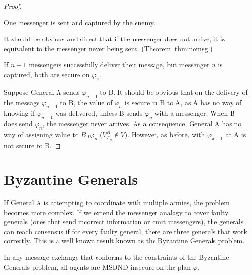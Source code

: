 \begin{proof}
\begin{case}
One messenger is sent and captured by the enemy.
\end{case}

It should be obvious and direct that if the messenger does not arrive, it is equivalent to the messenger never being sent. (Theorem \ref{thm:nomsg})

\begin{case}
If $n-1$ messengers successfully deliver their message, but messenger $n$ is captured, both are secure on $\varphi_{n}$.
\end{case}

Suppose General A sends $\varphi_{n-1}$ to B. It should be obvious that on the delivery of the message $\varphi_{n-1}$ to B, the value of $\varphi_{n}$ is secure in B to A, as A has no way of knowing if $\varphi_{n-1}$ was delivered, unless B sends $\varphi_{n}$ with a messenger. When B does send $\varphi_{n}$, the messenger never arrives. As a consequence, General A has no way of assigning value to $B_A \varphi_n$ ($V_{\varphi_n}^A \not \in V$). However, as before, with $\varphi_{n-1}$ at A is not secure to B.
\end{proof}


\section{Byzantine Generals}

If General A is attempting to coordinate with multiple armies, the problem becomes more complex. If we extend the messenger analogy to cover faulty generals (ones that send incorrect information or omit messengers), the generals can reach consensus if for every faulty general, there are three generals that work correctly. This is a well known result known as the Byzantine Generals problem.

\begin{thm}
In any message exchange that conforms to the constraints of the Byzantine Generals problem, all agents are MSDND insecure on the plan $\varphi$.
\end{thm}


